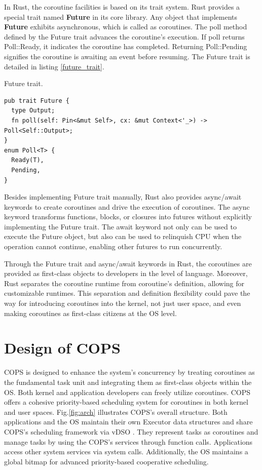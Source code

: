 \documentclass[conference]{IEEEtran}
\begin{document}
In Rust, the coroutine facilities is based on its trait system. Rust provides a special trait named \textbf{Future} in its core library. Any object that implements \textbf{Future} exhibits asynchronous, which is called as coroutines. The poll method defined by the Future trait advances the coroutine's execution. If poll returns Poll::Ready, it indicates the coroutine has completed. Returning Poll::Pending signifies the coroutine is awaiting an event before resuming. The Future trait is detailed in listing \ref{future_trait}.

\begin{listing}[tbp]
\caption{Future trait.}
\label{future_trait}
\begin{mdframed}
\begin{verbatim}
pub trait Future {
  type Output;
  fn poll(self: Pin<&mut Self>, cx: &mut Context<'_>) -> Poll<Self::Output>;
}
enum Poll<T> {
  Ready(T),
  Pending,
}
\end{verbatim}
\end{mdframed}
\end{listing}

Besides implementing Future trait manually, Rust also provides async/await keywords to create coroutines and drive the execution of coroutines. The async keyword transforms functions, blocks, or closures into futures without explicitly implementing the Future trait. The await keyword not only can be used to execute the Future object, but also can be used to relinquish CPU when the operation cannot continue, enabling other futures to run concurrently.

Through the Future trait and async/await keywords in Rust, the coroutines are provided as first-class objects to developers in the level of language. Moreover, Rust separates the coroutine runtime from coroutine's definition, allowing for customizable runtimes. This separation and definition flexibility could pave the way for introducing coroutines into the kernel, not just user space, and even making coroutines as first-class citizens at the OS level.

\section{Design of COPS}
\label{section: design}

COPS is designed to enhance the system's concurrency by treating coroutines as the fundamental task unit and integrating them as first-class objects within the OS. Both kernel and application developers can freely utilize coroutines. COPS offers a cohesive priority-based scheduling system for coroutines in both kernel and user spaces. Fig.\ref{fig:arch} illustrates COPS's overall structure. Both applications and the OS maintain their own Executor data structures and share COPS's scheduling framework via vDSO \cite{michael_kerrisk_vdso7_2023}. They represent tasks as coroutines and manage tasks by using the COPS's services through function calls. Applications access other system services via system calls. Additionally, the OS maintains a global bitmap for advanced priority-based cooperative scheduling.
\end{document}
